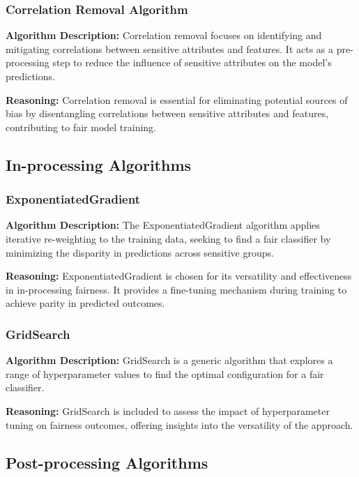 \subsubsection{Correlation Removal Algorithm}

\textbf{Algorithm Description:} Correlation removal focuses on identifying and mitigating correlations between sensitive attributes and features. It acts as a pre-processing step to reduce the influence of sensitive attributes on the model's predictions.

\textbf{Reasoning:} Correlation removal is essential for eliminating potential sources of bias by disentangling correlations between sensitive attributes and features, contributing to fair model training.

\subsection{In-processing Algorithms}

\subsubsection{ExponentiatedGradient}

\textbf{Algorithm Description:} The ExponentiatedGradient algorithm applies iterative re-weighting to the training data, seeking to find a fair classifier by minimizing the disparity in predictions across sensitive groups.

\textbf{Reasoning:} ExponentiatedGradient is chosen for its versatility and effectiveness in in-processing fairness. It provides a fine-tuning mechanism during training to achieve parity in predicted outcomes.

\subsubsection{GridSearch}

\textbf{Algorithm Description:} GridSearch is a generic algorithm that explores a range of hyperparameter values to find the optimal configuration for a fair classifier.

\textbf{Reasoning:} GridSearch is included to assess the impact of hyperparameter tuning on fairness outcomes, offering insights into the versatility of the approach.

\subsection{Post-processing Algorithms}

